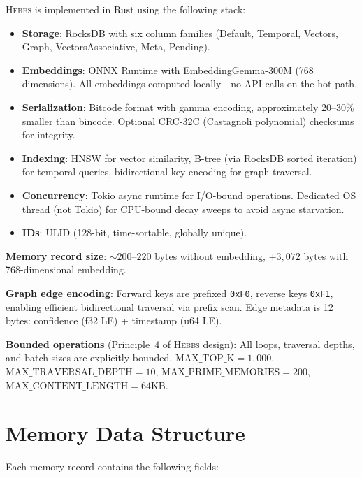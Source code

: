 \documentclass{article}
\begin{document}
\textsc{Hebbs} is implemented in Rust using the following stack:

\begin{itemize}
    \item \textbf{Storage}: RocksDB with six column families (Default, Temporal, Vectors, Graph, VectorsAssociative, Meta, Pending).
    \item \textbf{Embeddings}: ONNX Runtime with EmbeddingGemma-300M (768 dimensions). All embeddings computed locally---no API calls on the hot path.
    \item \textbf{Serialization}: Bitcode format with gamma encoding, approximately 20--30\% smaller than bincode. Optional CRC-32C (Castagnoli polynomial) checksums for integrity.
    \item \textbf{Indexing}: HNSW for vector similarity, B-tree (via RocksDB sorted iteration) for temporal queries, bidirectional key encoding for graph traversal.
    \item \textbf{Concurrency}: Tokio async runtime for I/O-bound operations. Dedicated OS thread (not Tokio) for CPU-bound decay sweeps to avoid async starvation.
    \item \textbf{IDs}: ULID (128-bit, time-sortable, globally unique).
\end{itemize}

\textbf{Memory record size}: ${\sim}200$--$220$ bytes without embedding, $+3{,}072$ bytes with 768-dimensional embedding.

\textbf{Graph edge encoding}: Forward keys are prefixed \texttt{0xF0}, reverse keys \texttt{0xF1}, enabling efficient bidirectional traversal via prefix scan. Edge metadata is 12 bytes: confidence (f32 LE) + timestamp (u64 LE).

\textbf{Bounded operations} (Principle~4 of \textsc{Hebbs} design): All loops, traversal depths, and batch sizes are explicitly bounded. $\text{MAX\_TOP\_K} = 1{,}000$, $\text{MAX\_TRAVERSAL\_DEPTH} = 10$, $\text{MAX\_PRIME\_MEMORIES} = 200$, $\text{MAX\_CONTENT\_LENGTH} = 64\text{KB}$.

\section{Memory Data Structure}
\label{app:memory}

Each memory record contains the following fields:
\end{document}
